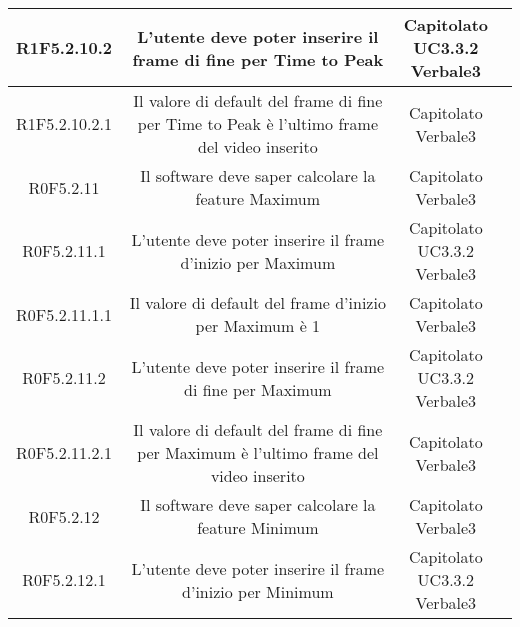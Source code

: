 \begin{center}
\begin{longtable}{|c|c|c|c|}
\hline
R1F5.2.10.2   & \parbox[t]{\larghezza}{L'utente deve poter inserire il frame di fine per Time to Peak}  & \parbox[t]{\dimFonti}{ Capitolato \\ UC3.3.2 \\ Verbale3 \\} \\
\hline
R1F5.2.10.2.1   & \parbox[t]{\larghezza}{Il valore di default del frame di fine per Time to Peak è l'ultimo frame del video inserito}  & \parbox[t]{\dimFonti}{ Capitolato \\ Verbale3 \\} \\
\hline
R0F5.2.11   & \parbox[t]{\larghezza}{Il software deve saper calcolare la feature\glossario{} Maximum}  & \parbox[t]{\dimFonti}{ Capitolato \\ Verbale3 \\} \\
\hline
R0F5.2.11.1   & \parbox[t]{\larghezza}{L'utente deve poter inserire il frame d'inizio per Maximum}  & \parbox[t]{\dimFonti}{ Capitolato \\ UC3.3.2 \\ Verbale3 \\} \\
\hline
R0F5.2.11.1.1   & \parbox[t]{\larghezza}{Il valore di default del frame d'inizio per Maximum è 1}  & \parbox[t]{\dimFonti}{ Capitolato \\ Verbale3 \\} \\
\hline
R0F5.2.11.2   & \parbox[t]{\larghezza}{L'utente deve poter inserire il frame di fine per Maximum}  & \parbox[t]{\dimFonti}{ Capitolato \\ UC3.3.2 \\ Verbale3 \\} \\
\hline
R0F5.2.11.2.1   & \parbox[t]{\larghezza}{Il valore di default del frame di fine per Maximum è l'ultimo frame del video inserito}  & \parbox[t]{\dimFonti}{ Capitolato \\ Verbale3 \\} \\
\hline
R0F5.2.12   & \parbox[t]{\larghezza}{Il software deve saper calcolare la feature\glossario{} {} Minimum}  & \parbox[t]{\dimFonti}{ Capitolato \\ Verbale3 \\} \\
\hline
R0F5.2.12.1   & \parbox[t]{\larghezza}{L'utente deve poter inserire il frame d'inizio per Minimum}  & \parbox[t]{\dimFonti}{ Capitolato \\ UC3.3.2 \\ Verbale3 \\} \\

\end{longtable}
\end{center}
